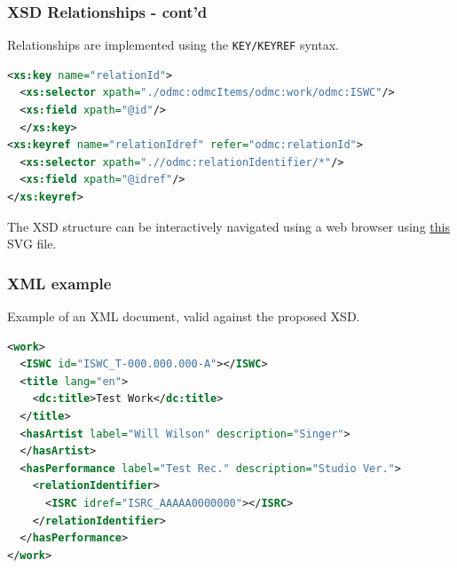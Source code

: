 \documentclass{beamer}
\begin{document}
  
  \begin{frame}[fragile]
    \frametitle{XSD Relationships - cont'd}
    
    Relationships are implemented using the \texttt{KEY/KEYREF} syntax.
    
    \vspace{1em}
    
    \lstset{basicstyle=\scriptsize\ttfamily}
\begin{lstlisting}[language=XML]
<xs:key name="relationId">
  <xs:selector xpath="./odmc:odmcItems/odmc:work/odmc:ISWC"/>
  <xs:field xpath="@id"/>
  </xs:key>
<xs:keyref name="relationIdref" refer="odmc:relationId">
  <xs:selector xpath=".//odmc:relationIdentifier/*"/>
  <xs:field xpath="@idref"/>
</xs:keyref>
\end{lstlisting}

    \vspace{1em}
    
    The XSD structure can be interactively navigated using a web browser using \href{https://github.com/pindri/ODMC_exam/blob/master/odmc.svg}{this} SVG file.
    
  \end{frame}



  \begin{frame}[fragile]
    \frametitle{XML example}

    Example of an XML document, valid against the proposed XSD.

    \vspace{0.5em}

    \lstset{basicstyle=\scriptsize\ttfamily}
\begin{lstlisting}[language=XML]
<work>
  <ISWC id="ISWC_T-000.000.000-A"></ISWC>
  <title lang="en">
    <dc:title>Test Work</dc:title>
  </title>
  <hasArtist label="Will Wilson" description="Singer">
  </hasArtist>
  <hasPerformance label="Test Rec." description="Studio Ver.">
    <relationIdentifier>
      <ISRC idref="ISRC_AAAAA0000000"></ISRC>
    </relationIdentifier>
  </hasPerformance>
</work>
\end{lstlisting}

  \end{frame}
\end{document}
